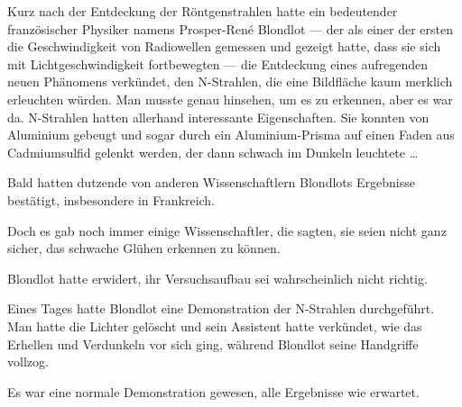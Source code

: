 Kurz nach der Entdeckung der Röntgenstrahlen hatte ein bedeutender französischer Physiker namens Prosper-René Blondlot — der als einer der ersten die Geschwindigkeit von Radiowellen gemessen und gezeigt hatte, dass sie sich mit Lichtgeschwindigkeit fortbewegten — die Entdeckung eines aufregenden neuen Phänomens verkündet, den N-Strahlen, die eine Bildfläche kaum merklich erleuchten würden. Man musste genau hinsehen, um es zu erkennen, aber es war da. N-Strahlen hatten allerhand interessante Eigenschaften. Sie konnten von Aluminium gebeugt und sogar durch ein Aluminium-Prisma auf einen Faden aus Cadmiumsulfid gelenkt werden, der dann schwach im Dunkeln leuchtete …

Bald hatten dutzende von anderen Wissenschaftlern Blondlots Ergebnisse bestätigt, insbesondere in Frankreich.

Doch es gab noch immer einige Wissenschaftler, die sagten, sie seien nicht ganz sicher, das schwache Glühen erkennen zu können.

Blondlot hatte erwidert, ihr Versuchsaufbau sei wahrscheinlich nicht richtig.

Eines Tages hatte Blondlot eine Demonstration der N-Strahlen durchgeführt. Man hatte die Lichter gelöscht und sein Assistent hatte verkündet, wie das Erhellen und Verdunkeln vor sich ging, während Blondlot seine Handgriffe vollzog.

Es war eine normale Demonstration gewesen, alle Ergebnisse wie erwartet.

